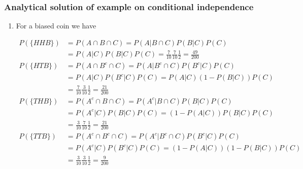 \begin{frame}
    \frametitle{Analytical solution of example on conditional independence}

    \scriptsize
    \begin{enumerate}[a]

        \conti
        \item
            For a biased coin we have

            \begin{align*}
                P(\{HHB\})&=P(A\cap B\cap C)=P(A|B\cap C)P(B|C)P(C)\\
                          &=P(A|C)P(B|C)P(C)=\frac{7}{10}\frac{7}{10}\frac{1}{2}=\frac{49}{200}\\
                P(\{HTB\})&=P(A\cap B^c\cap C)=P(A|B^c\cap C)P(B^c|C)P(C)\\
                          &=P(A|C)P(B^c|C)P(C)=P(A|C)(1-P(B|C))P(C)\\
                          &=\frac{7}{10}\frac{3}{10}\frac{1}{2}=\frac{21}{200}\\
                P(\{THB\})&=P(A^c\cap B\cap C)=P(A^c|B\cap C)P(B|C)P(C)\\
                          &=P(A^c|C)P(B|C)P(C)=(1-P(A|C))P(B|C)P(C)\\
                          &=\frac{3}{10}\frac{7}{10}\frac{1}{2}=\frac{21}{200}\\
                P(\{TTB\})&=P(A^c\cap B^c\cap C)=P(A^c|B^c\cap C)P(B^c|C)P(C)\\
                          &=P(A^c|C)P(B^c|C)P(C)=(1-P(A|C))(1-P(B|C))P(C)\\
                          &=\frac{3}{10}\frac{3}{10}\frac{1}{2}=\frac{9}{200}
            \end{align*}
    \end{enumerate}
    \normalsize

\end{frame}

